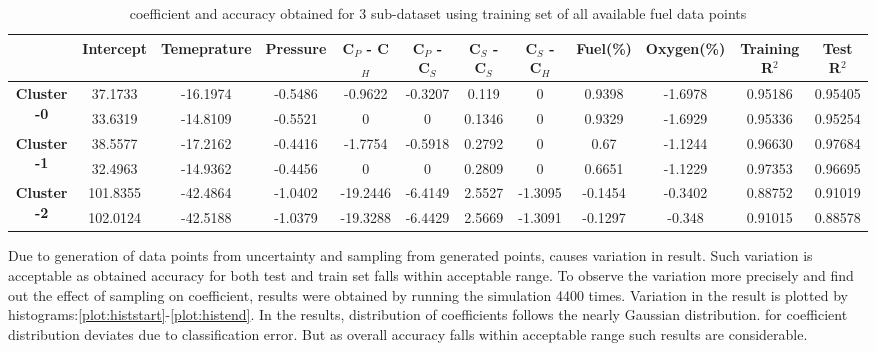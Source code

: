 \documentclass[preprint,12pt]{elsarticle}
\begin{document}
				  \begin{table}[H]
				  	\tiny \centering
				  		\begin{tabular}{|c|c|c|c|c|c|c|c|c|c|c|c|}
				  			\hline
				  			\textbf{} & \textbf{Intercept} & \textbf{Temeprature} & \textbf{Pressure} & \textbf{C$_P$ - C$_H$} & \textbf{C$_P$ - C$_S$} & \textbf{C$_S$ - C$_S$} & \textbf{C$_S$ - C$_H$} & \textbf{Fuel(\%)} & \textbf{Oxygen(\%)} & \textbf{Training R$^2$} & \textbf{Test R$^2$} \\ \hline
				  			\multirow{2}{*}{\textbf{Cluster -0}} & 37.1733 & -16.1974 & -0.5486 & -0.9622 & -0.3207 & 0.119 & 0 & 0.9398 & -1.6978 & 0.95186 & 0.95405 \\ \cline{2-12} 
				  			& 33.6319 & -14.8109 & -0.5521 & 0 & 0 & 0.1346 & 0 & 0.9329 & -1.6929 & 0.95336 & 0.95254 \\ \hline
				  			\multirow{2}{*}{\textbf{Cluster -1}} & 38.5577 & -17.2162 & -0.4416 & -1.7754 & -0.5918 & 0.2792 & 0 & 0.67 & -1.1244 & 0.96630 & 0.97684 \\ \cline{2-12} 
				  			& 32.4963 & -14.9362 & -0.4456 & 0 & 0 & 0.2809 & 0 & 0.6651 & -1.1229 & 0.97353 & 0.96695 \\ \hline
				  			\multirow{2}{*}{\textbf{Cluster -2}} & 101.8355 & -42.4864 & -1.0402 & -19.2446 & -6.4149 & 2.5527 & -1.3095 & -0.1454 & -0.3402 & 0.88752 & 0.91019 \\ \cline{2-12} 
				  			& 102.0124 & -42.5188 & -1.0379 & -19.3288 & -6.4429 & 2.5669 & -1.3091 & -0.1297 & -0.348 & 0.91015 & 0.88578 \\ \hline
				  		\end{tabular}
				  	\vspace{0.25cm}
				  	\caption{coefficient and accuracy obtained for 3 sub-dataset using training set of all available fuel data points }
				  	\label{table:coef}
				  \end{table}
				   Due to generation of data points from uncertainty and sampling from generated points, causes variation in result. Such variation is acceptable as obtained accuracy for both test and train set falls within acceptable range. To observe the variation more precisely and find out the effect of sampling on coefficient, results were obtained by running the simulation 4400 times. Variation in the result is plotted by histograms:\ref{plot:histstart}-\ref{plot:histend}. In the results, distribution of  coefficients follows the nearly Gaussian distribution. for coefficient distribution deviates due to classification error. But as overall accuracy falls within acceptable range such results are considerable. 
\end{document}
